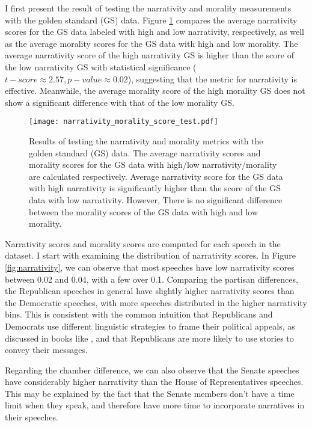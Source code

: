 \documentclass[a4paper]{article}
\begin{document}
I first present the result of testing the narrativity and morality measurements with the golden standard (GS) data. Figure \ref{fig:test} compares the average narrativity scores for the GS data labeled with high and low narrativity, respectively, as well as the average morality scores for the GS data with high and low morality. The average narrativity score of the high narrativity GS is higher than the score of the low narrativity GS with statistical significance ($t - score \approx 2.57, p-value \approx 0.02$), suggesting that the metric for narrativity is effective. Meanwhile, the average morality score of the high morality GS does not show a significant difference with that of the low morality GS.

\begin{figure}
\centering
\texttt{[image: narrativity\_morality\_score\_test.pdf]}
\caption{\label{fig:test} Results of testing the narrativity and morality metrics with the golden standard (GS) data. The average narrativity scores and morality scores for the GS data with high/low narrativity/morality are calculated respectively. Average narrativity score for the GS data with high narrativity is significantly higher than the score of the GS data with low narrativity. However, There is no significant difference between the morality scores of the GS data with high and low morality.}
\end{figure}

Narrativity scores and morality scores are computed for each speech in the dataset. I start with examining the distribution of narrativity scores. In Figure \ref{fig:narrativity}, we can observe that most speeches have low narrativity scores between 0.02 and 0.04, with a few over 0.1. Comparing the partisan differences, the Republican speeches in general have slightly higher narrativity scores than the Democratic speeches, with more speeches distributed in the higher narrativity bins. This is consistent with the common intuition that Republicans and Democrats use different linguistic strategies to frame their political appeals, as discussed in books like \cite{lakoff2014all}, and that Republicans are more likely to use stories to convey their messages. 

Regarding the chamber difference, we can also observe that the Senate speeches have considerably higher narrativity than the House of Representatives speeches. This may be explained by the fact that the Senate members don't have a time limit when they speak, and therefore have more time to incorporate narratives in their speeches.
\end{document}
